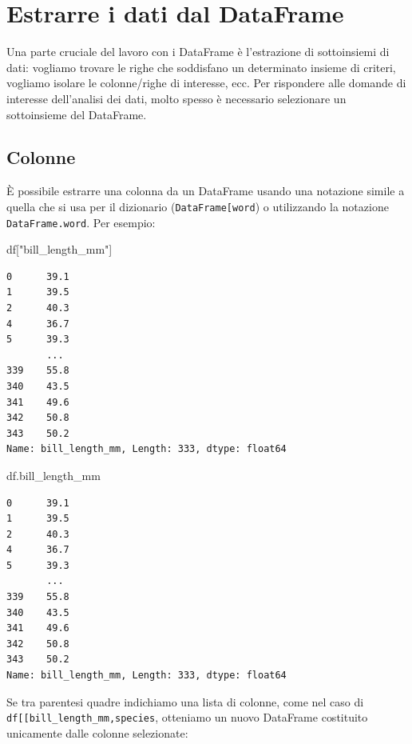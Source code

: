 \documentclass[
  letterpaper,
  krantz2]{{[}./krantz{]}}
\newenvironment{Shaded}{\begin{snugshade}}{\end{snugshade}}
\newcommand{\NormalTok}[1]{\textcolor[rgb]{0.00,0.23,0.31}{#1}}
\newcommand{\StringTok}[1]{\textcolor[rgb]{0.13,0.47,0.30}{#1}}
\begin{document}
\section{Estrarre i dati dal
DataFrame}\label{estrarre-i-dati-dal-dataframe}

Una parte cruciale del lavoro con i DataFrame è l'estrazione di
sottoinsiemi di dati: vogliamo trovare le righe che soddisfano un
determinato insieme di criteri, vogliamo isolare le colonne/righe di
interesse, ecc. Per rispondere alle domande di interesse dell'analisi
dei dati, molto spesso è necessario selezionare un sottoinsieme del
DataFrame.

\subsection{Colonne}\label{colonne}

È possibile estrarre una colonna da un DataFrame usando una notazione
simile a quella che si usa per il dizionario
(\texttt{DataFrame{[}\textquotesingle{}word\textquotesingle{}{]}}) o
utilizzando la notazione \texttt{DataFrame.word}. Per esempio:

\begin{Shaded}
\begin{Highlighting}[]
\NormalTok{df[}\StringTok{"bill\_length\_mm"}\NormalTok{]}
\end{Highlighting}
\end{Shaded}

\begin{verbatim}
0      39.1
1      39.5
2      40.3
4      36.7
5      39.3
       ... 
339    55.8
340    43.5
341    49.6
342    50.8
343    50.2
Name: bill_length_mm, Length: 333, dtype: float64
\end{verbatim}

\begin{Shaded}
\begin{Highlighting}[]
\NormalTok{df.bill\_length\_mm}
\end{Highlighting}
\end{Shaded}

\begin{verbatim}
0      39.1
1      39.5
2      40.3
4      36.7
5      39.3
       ... 
339    55.8
340    43.5
341    49.6
342    50.8
343    50.2
Name: bill_length_mm, Length: 333, dtype: float64
\end{verbatim}

Se tra parentesi quadre indichiamo una lista di colonne, come nel caso
di
\texttt{df{[}{[}\textquotesingle{}bill\_length\_mm\textquotesingle{},\textquotesingle{}species\textquotesingle{}{]}{]}},
otteniamo un nuovo DataFrame costituito unicamente dalle colonne
selezionate:
\end{document}
